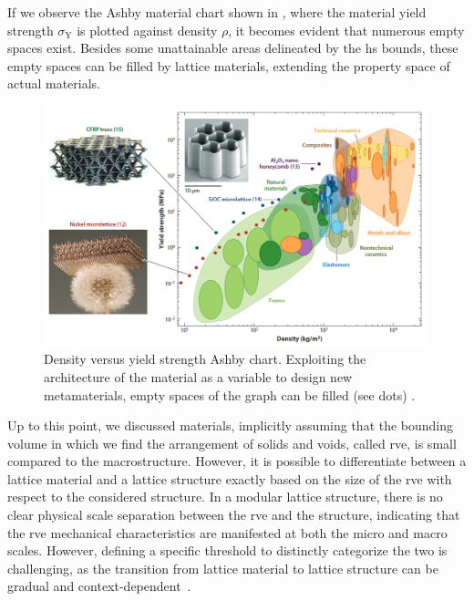 If we observe the Ashby material chart shown in , where the material yield strength $\sigma_\text{Y}$ is plotted against density $\rho$, it becomes evident that numerous empty spaces exist. Besides some unattainable areas delineated by the \gls{hs} bounds, these empty spaces can be filled by lattice materials, extending the property space of actual materials.
\begin{figure}
    \centering
    \includegraphics[width=\linewidth]{figures/02_literature/ashby_chart.png}
    \caption{Density versus yield strength Ashby chart. Exploiting the architecture of the material as a variable to design new metamaterials, empty spaces of the graph can be filled (see dots) \cite{schaedler_architected_2016}.}
    \label{fig:02_ashby_ch}
\end{figure}

Up to this point, we discussed materials, implicitly assuming that the bounding volume in which we find the arrangement of solids and voids, called \gls{rve}, is small compared to the macrostructure. However, it is possible to differentiate between a lattice material and a lattice structure exactly based on the size of the \gls{rve} with respect to the considered structure. In a modular lattice structure, there is no clear physical scale separation between the \gls{rve} and the structure, indicating that the \gls{rve} mechanical characteristics are manifested at both the micro and macro scales. However, defining a specific threshold to distinctly categorize the two is challenging, as the transition from lattice material to lattice structure can be gradual and context-dependent~.


